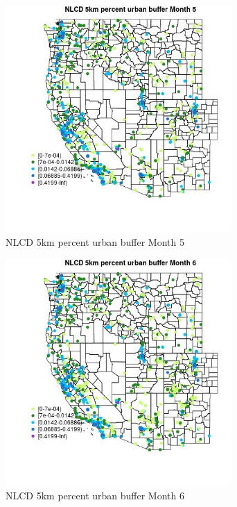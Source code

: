 \begin{figure} 
\centering  
\includegraphics[width=0.77\textwidth]{Code_Outputs/Report_ML_input_PM25_Step4_part_f_de_duplicated_aveswNAs_MapObsMo5NLCD_5km_percent_urban_buffer.jpg} 
\caption{\label{fig:Report_ML_input_PM25_Step4_part_f_de_duplicated_aveswNAsMapObsMo5NLCD_5km_percent_urban_buffer}NLCD 5km percent urban buffer Month 5} 
\end{figure} 
 

\begin{figure} 
\centering  
\includegraphics[width=0.77\textwidth]{Code_Outputs/Report_ML_input_PM25_Step4_part_f_de_duplicated_aveswNAs_MapObsMo6NLCD_5km_percent_urban_buffer.jpg} 
\caption{\label{fig:Report_ML_input_PM25_Step4_part_f_de_duplicated_aveswNAsMapObsMo6NLCD_5km_percent_urban_buffer}NLCD 5km percent urban buffer Month 6} 
\end{figure} 
 

